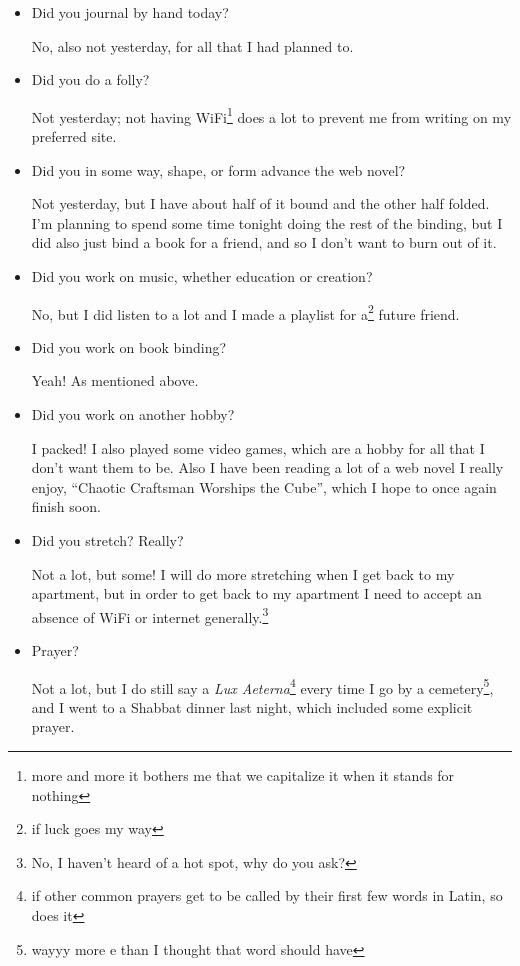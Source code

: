 \documentclass[12pt]{article}
\newcommand{\say}[1]{``#1''}
\renewcommand{\,}{\textsuperscript{,}}
\begin{document}
\begin{itemize}

\item Did you journal by hand today?

No, also not yesterday, for all that I had planned to.

\item Did you do a folly?

Not yesterday; not having WiFi\footnote{more and more it bothers me that we capitalize it when it stands for nothing} does a lot to prevent me from writing on my preferred site.

\item Did you in some way, shape, or form advance the web novel?

Not yesterday, but I have about half of it bound and the other half folded. I'm planning to spend some time tonight doing the rest of the binding, but I did also just bind a book for a friend, and so I don't want to burn out of it.

\item Did you work on music, whether education or creation?

No, but I did listen to a lot and I made a playlist for a\footnote{if luck goes my way} future friend.

\item Did you work on book binding?

Yeah! As mentioned above.

\item Did you work on another hobby?

I packed! I also played some video games, which are a hobby for all that I don't want them to be.  
Also I have been reading a lot of a web novel I really enjoy, \say{Chaotic Craftsman Worships the Cube}, which I hope to once again finish soon.

\item Did you stretch? Really?

Not a lot, but some! I will do more stretching when I get back to my apartment, but in order to get back to my apartment I need to accept an absence of WiFi or internet generally.\footnote{No, I haven't heard of a hot spot, why do you ask?}

\item Prayer?

Not a lot, but I do still say a \textit{Lux Aeterna}\footnote{if other common prayers get to be called by their first few words in Latin, so does it} every time I go by a cemetery\footnote{wayyy more e than I thought that word should have}, and I went to a Shabbat dinner last night, which included some explicit prayer.


\end{itemize}
\end{document}
